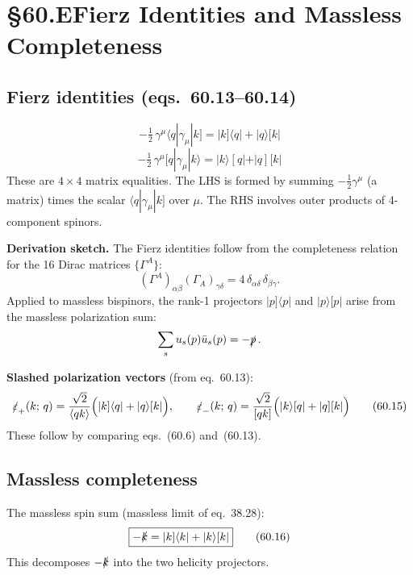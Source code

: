 \section{§60.E\quad Fierz Identities and Massless Completeness}

\subsection{Fierz identities (eqs.~60.13--60.14)}

\begin{equation}
  \boxed{
    -\tfrac12\,\gamma^\mu\langle q|\gamma_\mu|k]
    = |k]\langle q| + |q\rangle[k|
  }
  \tag{60.13}
\end{equation}
\begin{equation}
  -\tfrac12\,\gamma^\mu[q|\gamma_\mu|k\rangle
  = |k\rangle[q| + |q][k|
  \tag{60.14}
\end{equation}
These are $4\times4$ matrix equalities.  The LHS is formed by summing
$-\tfrac12\gamma^\mu$ (a matrix) times the scalar $\langle q|\gamma_\mu|k]$
over $\mu$.  The RHS involves outer products of 4-component spinors.

\textbf{Derivation sketch.}
The Fierz identities follow from the completeness relation for the 16 Dirac
matrices $\{\Gamma^A\}$:
\[
  (\Gamma^A)_{\alpha\beta}(\Gamma_A)_{\gamma\delta} = 4\,\delta_{\alpha\delta}\,\delta_{\beta\gamma}.
\]
Applied to massless bispinors, the rank-1 projectors $|p]\langle p|$ and
$|p\rangle[p|$ arise from the massless polarization sum:
\[
  \sum_s u_s(p)\bar u_s(p) = -\slashed p\,.
\]

\textbf{Slashed polarization vectors} (from eq.~60.13):
\begin{equation}
  \slashed\varepsilon_+(k;\,q) = \frac{\sqrt{2}}{\langle qk\rangle}\Bigl(|k]\langle q| + |q\rangle[k|\Bigr),
  \qquad
  \slashed\varepsilon_-(k;\,q) = \frac{\sqrt{2}}{[qk]}\Bigl(|k\rangle[q| + |q][k|\Bigr)
  \tag{60.15}
\end{equation}
These follow by comparing eqs.~(60.6) and~(60.13).

\subsection{Massless completeness}

The massless spin sum (massless limit of eq.~38.28):
\begin{equation}
  \boxed{
    -\slashed{k} = |k]\langle k| + |k\rangle[k|
  }
  \tag{60.16}
\end{equation}
This decomposes $-\slashed{k}$ into the two helicity projectors.

